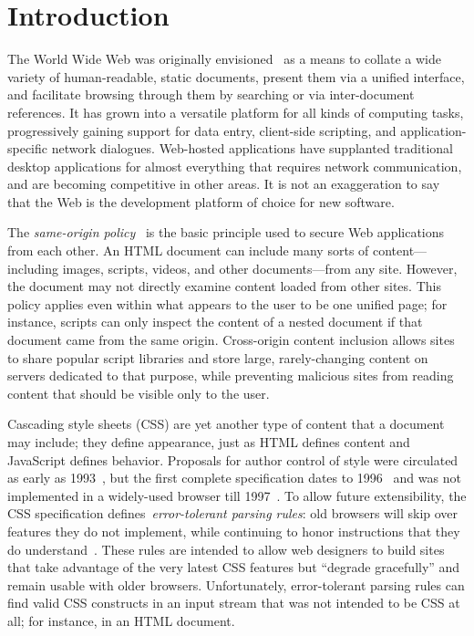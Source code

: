 \documentclass{acm_proc_article-sp}
\begin{document}


\section{Introduction}\label{sec:intro}

The World Wide Web was originally envisioned~\cite{wwwproposal} as a
means to collate a wide variety of human-readable, static documents,
present them via a unified interface, and facilitate browsing through
them by searching or via inter-document references. It has grown into
a versatile platform for all kinds of computing tasks, progressively
gaining support for data entry, client-side scripting, and
application-specific network dialogues.  Web-hosted applications have
supplanted traditional desktop applications for almost everything that
requires network communication, and are becoming competitive in other
areas.  It is not an exaggeration to say that the Web is the
development platform of choice for new software.

The \emph{same-origin policy}~\cite{mozillasameorigin} is the basic principle
used to secure Web applications from each other. An HTML document can include
many sorts of content---including images, scripts, videos, and other
documents---from any site. However, the document may not directly examine
content loaded from other sites. This policy applies even within what appears
to the user to be one unified page; for instance, scripts can only inspect the
content of a nested document if that document came from the same origin.
Cross-origin content inclusion allows sites to share popular script libraries
and store large, rarely-changing content on servers dedicated to that purpose,
while preventing malicious sites from reading content that should be visible
only to the user.

Cascading style sheets (CSS) are yet another type of content that a document
may include; they define appearance, just as HTML defines content and
JavaScript defines behavior. Proposals for author control of style were
circulated as early as 1993~\cite{css-history}, but the first complete
specification dates to 1996~\cite{css1} and was not implemented in a
widely-used browser till 1997~\cite{eich}. To allow future extensibility, the
CSS specification defines~\emph{error-tolerant parsing rules}: old
browsers will skip over features they do not implement, while continuing to
honor instructions that they do understand~\cite{syndata}. These rules are
intended to allow web designers to build sites that take advantage of the very
latest CSS features but ``degrade gracefully'' and remain usable with older
browsers. Unfortunately, error-tolerant parsing rules can find valid CSS
constructs in an input stream that was not intended to be CSS at all; for
instance, in an HTML document.
\end{document}
